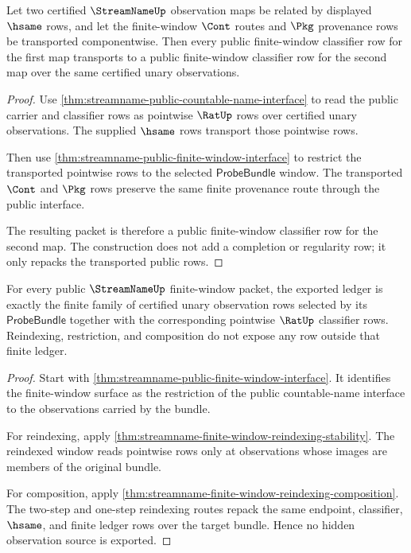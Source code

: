 \begin{theorem}
\label{thm:streamname-public-transport-obligation}
Let two certified $\StreamNameUp$ observation maps be related by displayed
$\hsame$ rows, and let the finite-window $\Cont$ routes and $\Pkg$ provenance
rows be transported componentwise. Then every public finite-window classifier
row for the first map transports to a public finite-window classifier row for
the second map over the same certified unary observations.
\end{theorem}
\begin{proof}
Use \autoref{thm:streamname-public-countable-name-interface} to read the
public carrier and classifier rows as pointwise $\RatUp$ rows over certified
unary observations. The supplied $\hsame$ rows transport those pointwise rows.

Then use \autoref{thm:streamname-public-finite-window-interface} to restrict
the transported pointwise rows to the selected $\mathsf{ProbeBundle}$ window.
The transported $\Cont$ and $\Pkg$ rows preserve the same finite provenance
route through the public interface.

The resulting packet is therefore a public finite-window classifier row for
the second map. The construction does not add a completion or regularity row;
it only repacks the transported public rows.
\end{proof}

\begin{theorem}
\label{thm:streamname-public-ledger-obligation}
For every public $\StreamNameUp$ finite-window packet, the exported ledger is
exactly the finite family of certified unary observation rows selected by its
$\mathsf{ProbeBundle}$ together with the corresponding pointwise $\RatUp$
classifier rows. Reindexing, restriction, and composition do not expose any
row outside that finite ledger.
\end{theorem}
\begin{proof}
Start with \autoref{thm:streamname-public-finite-window-interface}. It
identifies the finite-window surface as the restriction of the public
countable-name interface to the observations carried by the bundle.

For reindexing, apply
\autoref{thm:streamname-finite-window-reindexing-stability}. The reindexed
window reads pointwise rows only at observations whose images are members of
the original bundle.

For composition, apply
\autoref{thm:streamname-finite-window-reindexing-composition}. The two-step
and one-step reindexing routes repack the same endpoint, classifier, $\hsame$,
and finite ledger rows over the target bundle. Hence no hidden observation
source is exported.
\end{proof}

